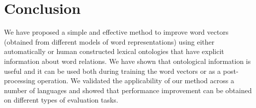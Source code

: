 \documentclass[11pt]{article}
\begin{document}
\section{Conclusion}

We have proposed a simple and effective method to improve
word vectors (obtained from different models of word representations)
using either automatically or human constructed lexical ontologies
that have explicit information about word relations. We have shown that
ontological information is useful and it can be used both during training
the word vectors or as a post-processing operation. We validated the
applicability of our method across a number of languages and showed that 
performance improvement can be obtained on different types of evaluation tasks.



\end{document}
